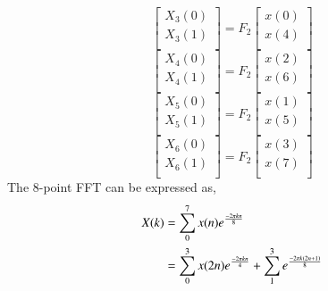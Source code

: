 \documentclass[journal,12pt,twocolumn]{IEEEtran}
\renewcommand\thesection{\arabic{section}}
\begin{document}
\begin{enumerate}[label=\arabic*.,ref=\thesection.\theenumi]
\begin{equation}
    \begin{bmatrix}
    X_{3}(0) \\ 
    X_{3}(1)\\ 
    \end{bmatrix}
    = F_{2}
    \begin{bmatrix}
    x(0) \\ 
    x(4) \\ 
    \end{bmatrix}
    \end{equation}
    \begin{equation}
    \begin{bmatrix}
    X_{4}(0) \\ 
    X_{4}(1)\\ 
    \end{bmatrix}
    = F_{2}
    \begin{bmatrix}
    x(2) \\ 
    x(6) \\ 
    \end{bmatrix}
    \end{equation}
    \begin{equation}
    \begin{bmatrix}
    X_{5}(0) \\ 
    X_{5}(1)\\ 
    \end{bmatrix}
    = F_{2}
    \begin{bmatrix}
    x(1) \\ 
    x(5) \\ 
    \end{bmatrix}
    \end{equation}
    \begin{equation}
    \begin{bmatrix}
    X_{6}(0) \\ 
    X_{6}(1)\\ 
    \end{bmatrix}
    = F_{2}
    \begin{bmatrix}
    x(3) \\ 
    x(7) \\ 
    \end{bmatrix}
    \end{equation}
    \solution The 8-point FFT can be expressed as,
     \begin{align}
       X(k) &= \sum_{0}^{7}x(n)e^{\frac{-2\pi kn}{8}} \\
            &= \sum_{0}^{3}x(2n)e^{\frac{-2 \pi kn}{4}} + \sum_{1}^{3}e^{\frac{-2 \pi k\brak{2n+1}}{8}} \\

\end{align}
\end{enumerate}
\end{document}
